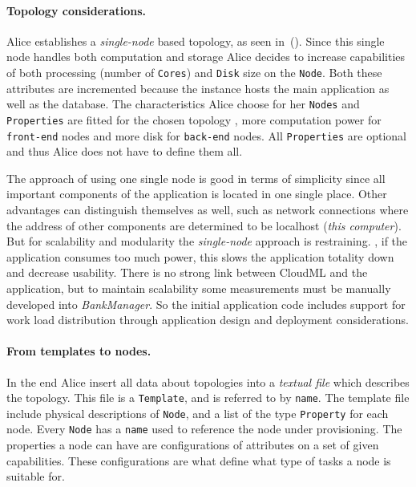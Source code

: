 \paragraph{Topology considerations.}

Alice establishes a \emph{single-node} based topology, as seen in~().
Since this single node handles both computation and storage Alice decides to 
increase capabilities of both processing (number of \texttt{Cores}) and 
\texttt{Disk} size on the \texttt{Node}.
Both these attributes are incremented because the instance hosts
the main application as well as the database.
The characteristics Alice choose for her \texttt{Nodes} and \texttt{Properties} are fitted
for the chosen topology \eg, more computation power for \texttt{front-end} nodes and more disk for \texttt{back-end} nodes.
All \texttt{Properties} are optional and thus Alice does not have to define them all.

The approach of using one single node is good in terms of simplicity since all important
components of the application is located in one single place.
Other advantages can distinguish themselves as well, such as network connections where
the address of other components are determined to be localhost (\emph{this computer}).
But for scalability and modularity the \emph{single-node} approach is restraining.
\eg, if the application consumes too much  power, 
this slows the application totality down and decrease usability.
There is no strong link between CloudML and the application, but to maintain
scalability some measurements must be manually developed into \emph{BankManager}.
So the initial application code includes support for work load distribution through 
application design and deployment considerations.

\paragraph{From templates to nodes.}

In the end Alice insert all data about topologies into a \emph{textual file} which describes the topology.
This file is a \texttt{Template}, and is referred to by \texttt{name}.
The template file include physical descriptions of \texttt{Node},
and a list of the type \texttt{Property} for each node.
Every \texttt{Node} has a \texttt{name} used to reference the node under provisioning.
The properties a node can have are configurations of attributes on a set of given capabilities.
These configurations are what define what type of tasks a node is suitable for.

